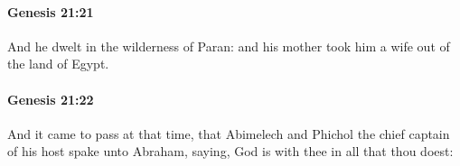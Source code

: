 		\paragraph{Genesis 21:21} %
			\label{GENESIS-21-21}

			And he dwelt in the wilderness of Paran: and his mother took him a wife out of the land of Egypt.


		\paragraph{Genesis 21:22} %
			\label{GENESIS-21-22}

			And it came to pass at that time, that Abimelech and Phichol the chief captain of his host spake unto Abraham, saying, God is with thee in all that thou doest:


